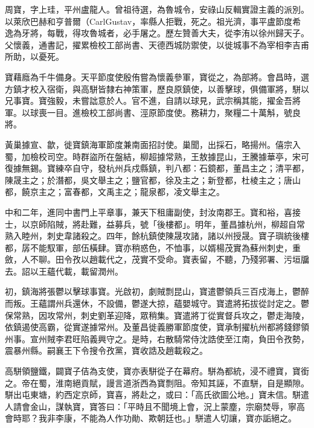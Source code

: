 
\begin{pinyinscope}

 周寶，字上珪，平州盧龍人。曾祖待選，為魯城令，安祿山反輯實證主義的派別。以萊欣巴赫和亨普爾（CarlGustav，率縣人拒戰，死之。祖光濟，事平盧節度希逸為牙將，每戰，得攻魯城者，必手屠之。歷左贊善大夫，從李洧以徐州歸天子。父懷義，通書記，擢累檢校工部尚書、天德西城防禦使，以徙城事不為宰相李吉甫所助，以憂死。



 寶藉廕為千牛備身。天平節度使殷侑嘗為懷義參軍，寶從之，為部將。會昌時，選方鎮才校入宿衛，與高駢皆隸右神策軍，歷良原鎮使，以善擊球，俱備軍將，駢以兄事寶。寶強毅，未嘗詘意於人。官不進，自請以球見，武宗稱其能，擢金吾將軍。以球喪一目。進檢校工部尚書、涇原節度使。務耕力，聚糧二十萬斛，號良將。



 黃巢據宣、歙，徙寶鎮海軍節度兼南面招討使。巢聞，出採石，略揚州。僖宗入蜀，加檢校司空。時群盜所在盤結，柳超據常熟，王敖據昆山，王騰據華亭，宋可復據無錫。寶練卒自守，發杭州兵戍縣鎮，判八都：石鏡都，董昌主之；清平都，陳晟主之；於潛都，吳文舉主之；鹽官都，徐及主之；新登都，杜棱主之；唐山都，饒京主之；富春都，文禹主之；龍泉都，凌文舉主之。



 中和二年，進同中書門上平章事，兼天下租庸副使，封汝南郡王。寶和裕，喜接士，以京師陷賊，將赴難，益募兵，號「後樓都」。明年，董昌據杭州，柳超自常熟入睦州，刺史韋諸殺之。四年，餘杭鎮使陳晟攻諸，諸以州授晟。寶子璵統後樓都，孱不能馭軍，部伍橫肆。寶亦稍惑色，不恤事，以婿楊茂實為蘇州刺史，重斂，人不聊。田令孜以趙載代之，茂實不受命。寶表留，不聽，乃殘郛署、污垣牖去。詔以王蘊代載，載留潤州。



 初，鎮海將張鬱以擊球事寶。光啟初，劇賊剽昆山，寶遣鬱領兵三百戍海上，鬱醉而叛。王蘊謂州兵還休，不設備，鬱遂大掠，蘊嬰城守。寶遣將拓拔從討定之。鬱保常熟，因攻常州，刺史劉革迎降，眾稍集。寶遣將丁從實督兵攻之，鬱走海陵，依鎮遏使高霸，從實遂據常州。及董昌徙義勝軍節度使，寶承制擢杭州都將錢鏐領州事。宣州賊李君旺陷義興守之。是時，右散騎常侍沈誥使至江南，負田令孜勢，震暴州縣。嗣襄王下令搜令孜黨，寶收誥及趙載殺之。



 高駢領鹽鐵，闢寶子佶為支使，寶亦表駢從子在幕府。駢為都統，浸不禮寶，寶銜之。帝在蜀，淮南絕貢賦，謾言道浙西為寶剽阻。帝知其誣，不直駢，自是顯隙。駢出屯東塘，約西定京師，寶喜，將赴之，或曰：「高氏欲圖公地。」寶未信。駢遣人請會金山，謀執寶，寶答曰：「平時且不聞境上會，況上蒙塵，宗廟焚辱，寧高會時耶？我非李康，不能為人作功勛、欺朝廷也。」駢遣人切讓，寶亦詬絕之。




\end{pinyinscope}
